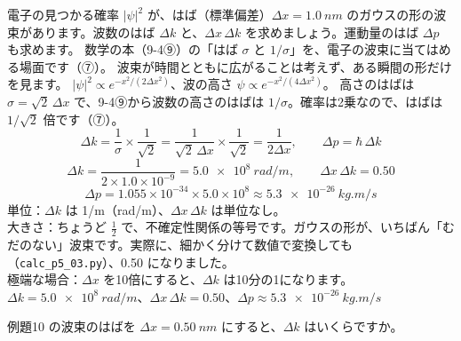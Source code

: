 \label{ph:原-3:ex10}
\begin{phreidai}[ガウスの形の波束]
電子の見つかる確率 $|\psi|^2$ が、はば（標準偏差）$\Delta x=\qty{1.0}{nm}$ のガウスの形の波束があります。波数のはば $\Delta k$ と、$\Delta x\,\Delta k$ を求めましょう。運動量のはば $\Delta p$ も求めます。
\phbamen
数学の本（9-4⑨）の「はば $\sigma$ と $1/\sigma$」を、電子の波束に当てはめる場面です（⑦）。
\phmushi
波束が時間とともに広がることは考えず、ある瞬間の形だけを見ます。
\phzu
$|\psi|^2\propto e^{-x^2/(2\Delta x^2)}$、波の高さ $\psi\propto e^{-x^2/(4\Delta x^2)}$。
\phriyu
高さのはばは $\sigma=\sqrt2\,\Delta x$ で、9-4⑨から波数の高さのはばは $1/\sigma$。確率は2乗なので、はばは $1/\sqrt2$ 倍です（⑦）。
\phtateru
\[ \Delta k=\frac{1}{\sigma}\times\frac{1}{\sqrt2}=\frac{1}{\sqrt2\,\Delta x}\times\frac{1}{\sqrt2}=\frac{1}{2\Delta x},\qquad\Delta p=\hbar\,\Delta k \]
\phtoku
\[ \Delta k=\frac{1}{2\times1.0\times10^{-9}}=\qty{5.0e8}{rad/m},\qquad\Delta x\,\Delta k=0.50 \]
\[ \Delta p=1.055\times10^{-34}\times5.0\times10^{8}\approx\qty{5.3e-26}{kg.m/s} \]
\phtashikame
単位：$\Delta k$ は 1/m（rad/m）、$\Delta x\,\Delta k$ は単位なし。\\
大きさ：ちょうど $\tfrac12$ で、不確定性関係の等号です。ガウスの形が、いちばん「むだのない」波束です。実際に、細かく分けて数値で変換しても（\texttt{calc\_p5\_03.py}）、0.50 になりました。\\
極端な場合：$\Delta x$ を10倍にすると、$\Delta k$ は10分の1になります。
\kotae $\Delta k=\qty{5.0e8}{rad/m}$、$\Delta x\,\Delta k=0.50$、$\Delta p\approx\qty{5.3e-26}{kg.m/s}$
\end{phreidai}
\begin{jibun}
例題10 の波束のはばを $\Delta x=\qty{0.50}{nm}$ にすると、$\Delta k$ はいくらですか。
\end{jibun}

